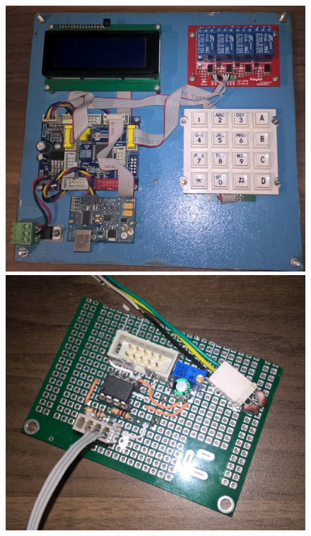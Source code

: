 \begin{figure}[H]
\includegraphics[scale=0.135]{./image/img/KIT.jpg} \hspace{.2cm}
\includegraphics[scale=0.135]{./image/img/InstAmpSen_1.jpg} \\
\end{figure}
